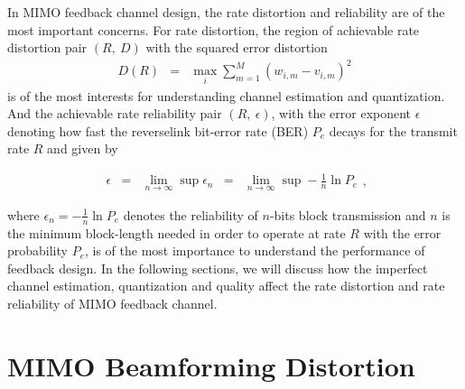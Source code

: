 \documentclass[10pt,fleqn, twocolumn]{IEEEtran}
\begin{document}
In MIMO feedback channel design, the rate distortion and
reliability are of the most important concerns. For rate
distortion, the region of achievable rate distortion pair
$\left(R,\ D\right)$ with the squared error distortion
\begin{equation}
\begin{array}{rcl}
D\left(R\right)&=&\max\limits_{i}\sum\limits_{m=1}^{M}\left(w_{i,m}-v_{i,m}\right)^2
\end{array}\label{squared_error_distortion}
\end{equation}
\noindent is of the most interests for understanding channel
estimation and quantization. And the achievable rate reliability
pair $\left(R,\ \epsilon\right)$, with the error exponent
$\epsilon$ denoting how fast the reverselink bit-error rate (BER)
$P_{e}$ decays for the transmit rate $R$ and given by

\begin{equation}
\begin{array}{rcccl}
\epsilon&=&\lim\limits_{n\rightarrow\infty}\sup
\epsilon_{n}&=&\lim\limits_{n\rightarrow\infty}\sup-\frac{1}{n}\ln
P_{e}
\end{array},
\end{equation}

\noindent where $\epsilon_{n}=-\frac{1}{n}\ln P_{e}$ denotes the
reliability of $n$-bits block transmission and $n$ is the minimum
block-length needed in order to operate at rate $R$ with the error
probability $P_{e}$, is of the most importance to understand the
performance of feedback design. In the following sections, we will
discuss how the imperfect channel estimation, quantization and
quality affect the rate distortion and rate reliability of MIMO
feedback channel.

\section{MIMO Beamforming Distortion}
\end{document}
